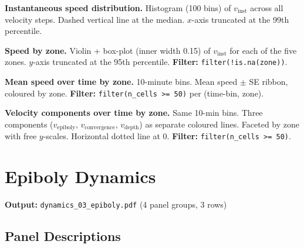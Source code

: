 \documentclass[11pt,a4paper]{article}
\begin{document}
\begin{description}[style=nextline,leftmargin=1.5cm]
  \item[02a] \textbf{Instantaneous speed distribution.}
    Histogram (100 bins) of $v_\mathrm{inst}$ across all velocity steps.
    Dashed vertical line at the median. $x$-axis truncated at the 99th
    percentile.

  \item[02b] \textbf{Speed by zone.}
    Violin + box-plot (inner width 0.15) of $v_\mathrm{inst}$ for each of
    the five zones.  $y$-axis truncated at the 95th percentile.
    \textbf{Filter:} \texttt{filter(!is.na(zone))}.

  \item[02c] \textbf{Mean speed over time by zone.}
    10-minute bins.  Mean speed $\pm$ SE ribbon, coloured by zone.
    \textbf{Filter:} \texttt{filter(n\_cells >= 50)} per (time-bin, zone).

  \item[02d] \textbf{Velocity components over time by zone.}
    Same 10-min bins.  Three components ($v_\mathrm{epiboly}$,
    $v_\mathrm{convergence}$, $v_\mathrm{depth}$) as separate coloured lines.
    Faceted by zone with free $y$-scales.  Horizontal dotted line at 0.
    \textbf{Filter:} \texttt{filter(n\_cells >= 50)}.
\end{description}


\section{Epiboly Dynamics}
\label{fig:epiboly}

\noindent\textbf{Output:} \texttt{dynamics\_03\_epiboly.pdf}
(4 panel groups, 3 rows)

\subsection*{Panel Descriptions}
\end{document}
